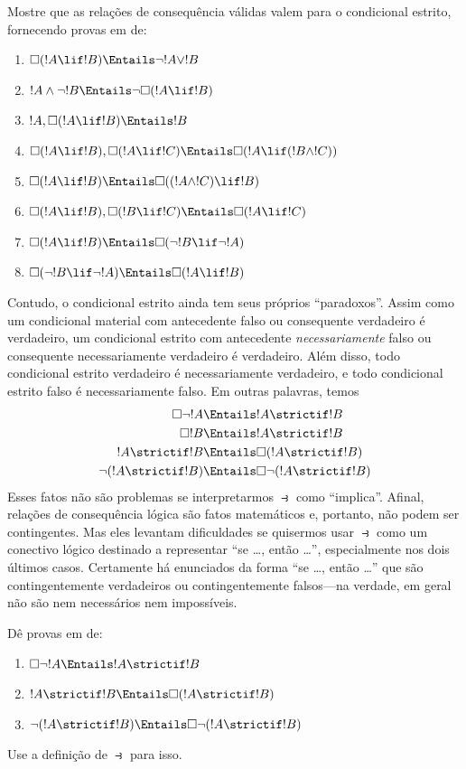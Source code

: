 \documentclass[../../../include/open-logic-section]{subfiles}
\begin{document}
\begin{prob}
  Mostre que as relações de consequência válidas valem para o condicional
  estrito, fornecendo provas em  de:
  \begin{enumerate}
  \item  $\Box(!A \lif !B) \Entails \lnot !A \lor !B$
  \item $!A \land \lnot !B \Entails \lnot\Box(!A \lif !B)$
  \item $!A, \Box(!A \lif !B) \Entails !B$
  \item $\Box(!A \lif !B), \Box(!A \lif !C) \Entails \Box(!A \lif (!B
    \land !C))$
  \item $\Box(!A \lif !B) \Entails \Box((!A \land !C) \lif !B)$
  \item $\Box(!A \lif !B), \Box(!B \lif !C) \Entails \Box(!A
    \lif !C)$
  \item $\Box(!A \lif !B) \Entails \Box(\lnot !B \lif \lnot !A)$
  \item $\Box(\lnot !B \lif \lnot !A) \Entails \Box(!A \lif !B)$
  \end{enumerate}
  \end{prob}

Contudo, o condicional estrito ainda tem seus próprios ``paradoxos''.
Assim como um condicional material com antecedente falso ou consequente verdadeiro
é verdadeiro, um condicional estrito com antecedente \emph{necessariamente}
falso ou consequente necessariamente verdadeiro é verdadeiro. Além disso, todo
condicional estrito verdadeiro é necessariamente verdadeiro, e todo condicional estrito
falso é necessariamente falso. Em outras palavras, temos
\begin{align}
  \Box \lnot !A & \Entails !A \strictif !B\\
  \Box !B & \Entails !A \strictif !B\\
  !A \strictif !B& \Entails \Box(!A \strictif !B)\\
  \lnot(!A \strictif !B) & \Entails \Box\lnot(!A \strictif !B)
\end{align}
Esses fatos não são problemas se interpretarmos $\strictif$ como ``implica''.
Afinal, relações de consequência lógica são fatos matemáticos e, portanto,
não podem ser contingentes. Mas eles levantam dificuldades se quisermos usar
$\strictif$ como um conectivo lógico destinado a representar ``se
\dots, então \dots'', especialmente nos dois últimos casos. Certamente há enunciados
da forma ``se \dots, então \dots'' que são contingentemente verdadeiros ou
contingentemente falsos---na verdade, em geral não são nem necessários nem
impossíveis.

\begin{prob}
  Dê provas em  de:
  \begin{enumerate}
    \item  $\Box \lnot !A \Entails !A \strictif !B$
    \item $!A \strictif !B \Entails \Box(!A \strictif !B)$
    \item $\lnot(!A \strictif !B)  \Entails \Box\lnot(!A \strictif !B)$
  \end{enumerate}
  Use a definição de $\strictif$ para isso.
\end{prob}
\end{document}
